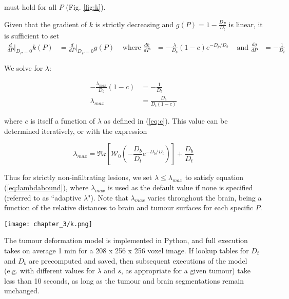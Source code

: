 must hold for all $P$ (Fig. \ref{fig:k}).

Given that the gradient of $k$ is strictly decreasing and $g(P) = 1 - \frac{D_P}{D_t}$ is linear, it is sufficient to set
\begin{align*}
  \frac{d}{dP}\bigg\rvert_{D_P=0}k(P) &= \frac{d}{dP}\bigg\rvert_{D_P=0}g(P) &\text{ where } \frac{dk}{dP} &= -\frac{\lambda}{D_b}(1-c)e^{-D_p/D_b} &\text{ and } \frac{dg}{dP} &= -\frac{1}{D_t}
\end{align*}

We solve for $\lambda$:

\begin{align*}
  -\frac{\lambda_{max}}{D_b}(1-c) &= -\frac{1}{D_t} \\
  \lambda_{max} &= \frac{D_b}{D_t (1-c)}
\end{align*}

where $c$ is itself a function of $\lambda$ as defined in (\ref{eq:c}). This value can be determined iteratively, or with the expression

\begin{equation}
  \lambda_{max} = \mathfrak{Re} \left[ \mathcal{W}_0(-\frac{D_b}{D_t}e^{-D_b/D_t}) \right] +\frac{D_b}{D_t}
\end{equation}

Thus for strictly non-infiltrating lesions, we set $\lambda \leq \lambda_{max}$ to satisfy equation (\ref{eq:lambdabound}), where $\lambda_{max}$ is used as the default value if none is specified (referred to as ``adaptive $\lambda$").
Note that $\lambda_{max}$ varies throughout the brain, being a function of the relative distances to brain and tumour surfaces for each specific $P$.

\begin{SCfigure}[][h!]
  \captionsetup{format=plain}
  \texttt{[image: chapter\_3/k.png]}
  \caption{Deformation factor $k$ as a function of $D_P$. $\lambda$ must be small enough such that $k_{\lambda}$ is strictly above the line $1-(\frac{D_P}{D_t})$ (dashed line). An exponential $k$ with $\lambda_{max}$ is plotted in solid black, compared with a linear $k$ as proposed in \textcite{Nowinski2005} (dotted line).}
  \label{fig:k}
\end{SCfigure}

The tumour deformation model is implemented in Python, and full execution takes on average 1 min for a 208 x 256 x 256 voxel image.
If lookup tables for $ D_t$ and $D_b$ are precomputed and saved, then subsequent executions of the model (e.g. with different values for $\lambda$ and $s$, as appropriate for a given tumour) take less than 10 seconds, as long as the tumour and brain segmentations remain unchanged.

